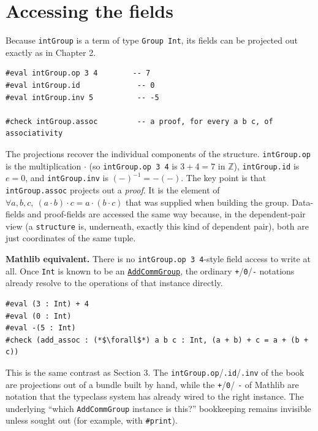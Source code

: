 \section{Accessing the fields}\label{sec:06-groups:05-accessing-fields:1}

Because \texttt{intGroup} is a term of type \texttt{Group Int}, its fields can be projected out exactly as in Chapter 2.

\begin{lstlisting}
#eval intGroup.op 3 4        -- 7
#eval intGroup.id             -- 0
#eval intGroup.inv 5          -- -5

#check intGroup.assoc         -- a proof, for every a b c, of associativity
\end{lstlisting}

\begin{mathreading}

The projections recover the individual components of the structure. \texttt{intGroup.op} is the multiplication \(\cdot\) (so \texttt{intGroup.op 3 4} is \(3 + 4 = 7\) in \(\mathbb{Z}\)), \texttt{intGroup.id} is \(e = 0\), and \texttt{intGroup.inv} is \((-)^{-1} = -(-)\). The key point is that \texttt{intGroup.assoc} projects out a \emph{proof}. It is the element of \(\forall a,b,c,\ (a\cdot b)\cdot c = a\cdot(b\cdot c)\) that was supplied when building the group. Data-fields and proof-fields are accessed the same way because, in the dependent-pair view (a \texttt{structure} is, underneath, exactly this kind of dependent pair), both are just coordinates of the same tuple.

\end{mathreading}

\textbf{Mathlib equivalent.} There is no \texttt{intGroup.op 3 4}-style field access to write at all. Once \texttt{Int} is known to be an \href{https://loogle.lean-lang.org/?q=AddCommGroup}{\texttt{AddCommGroup}}, the ordinary \texttt{+}/\texttt{0}/\texttt{-\allowbreak{}} notations already resolve to the operations of that instance directly.

\begin{lstlisting}
#eval (3 : Int) + 4
#eval (0 : Int)
#eval -(5 : Int)
#check (add_assoc : (*$\forall$*) a b c : Int, (a + b) + c = a + (b + c))
\end{lstlisting}

This is the same contrast as Section 3. The \texttt{intGroup.op}/\texttt{.id}/\texttt{.inv} of the book are projections out of a bundle built by hand, while the \texttt{+}/\texttt{0}/ \texttt{-\allowbreak{}} of Mathlib are notation that the typeclass system has already wired to the right instance. The underlying ``which \texttt{AddCommGroup} instance is this?'' bookkeeping remains invisible unless sought out (for example, with \texttt{\#print}).
